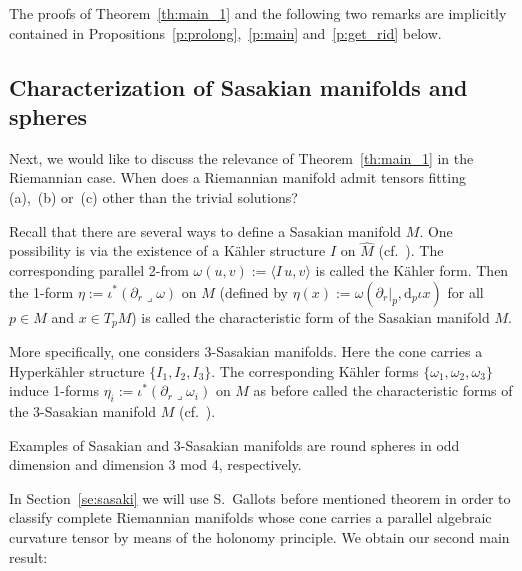 \documentclass[11pt,a4paper]{article}
\theoremstyle{plain}
\theoremstyle{remark}
\renewcommand{\d}{\mathrm{d}}
\def\pd{\partial}
\begin{document}
The proofs of Theorem~\ref{th:main_1} and the following two remarks are implicitly contained in 
Propositions~\ref{p:prolong},~\ref{p:main} and~\ref{p:get_rid} below.

\subsection{Characterization of Sasakian manifolds and spheres}
Next, we would like to discuss the relevance of Theorem~\ref{th:main_1} in the Riemannian case. When does a Riemannian
manifold admit tensors fitting (a),~(b) or~(c) other than the trivial solutions?

Recall that there are several ways to define a Sasakian manifold
$M$. One possibility is via the existence of a Kähler 
structure $I$ on $\hat M$ (cf.~\cite[Proposition~1.1.2]{BG}). The
corresponding parallel 2-from $\omega(u,v) := \langle I\, u,v\rangle$ is
called the Kähler form. Then the 1-form $\eta := \iota^*(\pd_r\lrcorner
\omega)$ on $M$ (defined by $\eta(x) := \omega(\pd_r|_p,\d_p\iota x)$ for all $p\in M$ and $x\in T_pM$) is called the characteristic form of the Sasakian manifold $M$. 

More specifically, one considers 3-Sasakian manifolds. Here the cone carries a Hyperkähler structure $\{I_1,I_2,I_3\}$. 
The corresponding Kähler forms $\{\omega_1,\omega_2,\omega_3\}$ induce 1-forms 
$\eta_i := \iota^*(\pd_r\lrcorner \omega_i)$ on $M$  as before called the characteristic forms 
of the 3-Sasakian manifold $M$ (cf.~\cite[Proposition~1.2.2]{BG}).

Examples of Sasakian and 3-Sasakian manifolds are round spheres in odd dimension and dimension 3 {\rm mod} 4, respectively. 


In Section~\ref{se:sasaki} we will use S.~Gallots before mentioned theorem in
order to classify complete Riemannian manifolds whose 
cone carries a parallel algebraic curvature tensor by means of the holonomy principle. We obtain our second main result:
\end{document}
